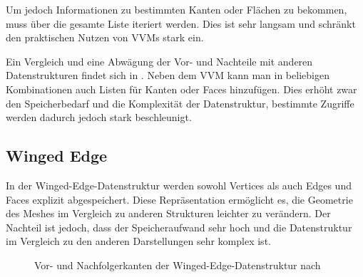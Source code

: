 Um jedoch Informationen zu bestimmten Kanten oder Flächen zu bekommen, muss über die gesamte Liste iteriert werden.
Dies ist sehr langsam und schränkt den praktischen Nutzen von \acp{VVM} stark ein.

Ein Vergleich und eine Abwägung der Vor- und Nachteile mit anderen Datenstrukturen findet sich in \cite[Kap. 11]{smith2006vertex}.
Neben dem \ac{VVM} kann man in beliebigen Kombinationen auch Listen für Kanten oder Faces hinzufügen.
Dies erhöht zwar den Speicherbedarf und die Komplexität der Datenstruktur, bestimmte Zugriffe werden dadurch jedoch stark beschleunigt.


\subsection{Winged Edge}
\label{subsec:winged-edge}

In der Winged-Edge-Datenstruktur \cite{baumgart1975polyhedron} werden sowohl Vertices als auch Edges und Faces explizit abgespeichert.
Diese Repräsentation ermöglicht es, die Geometrie des Meshes im Vergleich zu anderen Strukturen leichter zu verändern.
Der Nachteil ist jedoch, dass der Speicheraufwand sehr hoch und die Datenstruktur im Vergleich zu den anderen Darstellungen sehr komplex ist.

\begin{figure}[ht]
\centering
{}
\caption{Vor- und Nachfolgerkanten der Winged-Edge-Datenstruktur nach \cite[591]{baumgart1975polyhedron}}
\label{fig:winged-edge-edges}
\end{figure}

